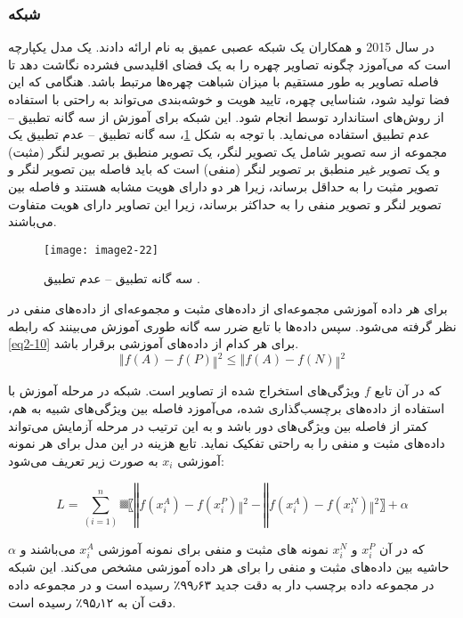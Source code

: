 \subsubsection{	شبکه }
در سال 2015  و همکاران \cite{7298682} یک شبکه عصبی عمیق به نام  ارائه دادند.  یک مدل یکپارچه است که می‌آموزد چگونه تصاویر چهره را به یک فضای اقلیدسی فشرده نگاشت دهد تا فاصله تصاویر به طور مستقیم با میزان شباهت چهره‌ها مرتبط باشد. هنگامی که این فضا تولید شود، شناسایی چهره، تایید هویت و خوشه‌بندی می‌تواند به راحتی با استفاده از روش‌های استاندارد توسط  انجام شود. این شبکه برای آموزش از سه گانه تطبیق – عدم تطبیق استفاده می‌نماید. با توجه به شکل \ref{image2-22}، سه گانه تطبیق – عدم تطبیق یک مجموعه از سه تصویر شامل یک تصویر لنگر، یک تصویر منطبق بر تصویر لنگر (مثبت) و یک تصویر غیر منطبق بر تصویر لنگر (منفی) است که باید فاصله بین تصویر لنگر و تصویر مثبت را به حداقل برساند، زیرا هر دو دارای هویت مشابه هستند و فاصله بین تصویر لنگر و تصویر منفی را به حداکثر برساند، زیرا این تصاویر دارای هویت متفاوت می‌باشند. 
 
\begin{figure}[h]
\centering
  \texttt{[image: image2-22]}
  \caption{سه گانه تطبیق – عدم تطبیق \cite{7298682}.}
  \label{image2-22}
\end{figure}

\noindent 
برای هر داده آموزشی  مجموعه‌ای از داده‌های مثبت و مجموعه‌ای از داده‌های منفی در نظر گرفته می‌شود. سپس داده‌ها با تابع ضرر سه گانه طوری آموزش می‌بینند که رابطه \ref{eq2-10} برای هر کدام از داده‌های آموزشی برقرار باشد.
\begin{equation}
\label{eq2-10}
‖f(A)-f(P)‖^2≤‖f(A)-f(N)‖^2	
\end{equation}

\noindent
که در آن تابع $f$ ویژگی‌های استخراج شده از تصاویر است. شبكه در مرحله آموزش با استفاده از داده‌های برچسب‌گذاری شده، می‌آموزد فاصله بین ویژگی‌های شبیه به هم، کمتر از فاصله بین ویژگی‌های دور باشد و به این ترتیب در مرحله آزمایش می‌تواند داده‌های مثبت و منفی را به راحتی تفكیک نماید. تابع هزینه در این مدل برای هر نمونه آموزشی $x_i$ به صورت زیر تعریف می‌شود:

\begin{equation}\label{eq2-11}
L=∑_(i=1)^n▒〖‖f(x_i^A )-f(x_i^P)‖^2-‖f(x_i^A )-f(x_i^N)‖^2 〗+ \alpha
\end{equation}

\noindent
که در آن $x_i^P$ و $x_i^N$ نمونه های مثبت و منفی برای نمونه آموزشی $x_i^A$ می‌باشند و $\alpha$ حاشیه بین داده‌های مثبت و منفی را برای هر داده آموزشی مشخص می‌کند. این شبکه در مجموعه داده برچسب دار  به دقت جدید ۹۹٫۶۳٪ رسیده است و در مجموعه داده  دقت آن به ۹۵٫۱۲٪ رسیده است.

